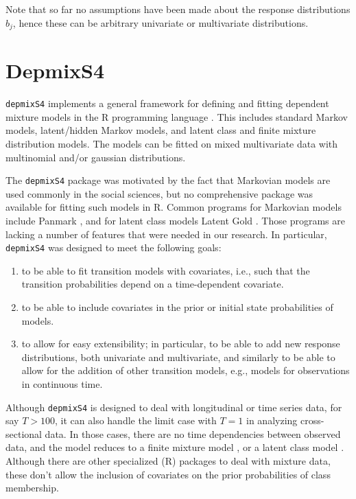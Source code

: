 \documentclass[a4paper,12pt,man]{apa} %
\newcommand{\citep}{\cite}
\newcommand{\pkg}{\texttt}
\begin{document}
Note that so far no assumptions have been made about the response
distributions $b_{j}$, hence these can be arbitrary univariate or
multivariate distributions.


\section{DepmixS4}

\pkg{depmixS4} implements a general framework for defining and fitting
dependent mixture models in the R programming language \citep{R2008}.
This includes standard Markov models, latent/hidden Markov models, and
latent class and finite mixture distribution models.  The models can
be fitted on mixed multivariate data with multinomial and/or gaussian
distributions.  

The \pkg{depmixS4} package was motivated by the fact that Markovian
models are used commonly in the social sciences, but no comprehensive
package was available for fitting such models in R. Common programs
for Markovian models include Panmark \citep{Pol1996}, and for latent
class models Latent Gold \citep{Vermunt2003}.  Those programs are
lacking a number of features that were needed in our research.  In
particular, \pkg{depmixS4} was designed to meet the following goals:
\begin{enumerate}

	\item to be able to fit transition models with covariates, i.e.,
	such that the transition probabilities depend on a time-dependent 
	covariate.

	\item to be able to include covariates in the prior or initial
	state probabilities of models.

	\item to allow for easy extensibility; in particular, to be able
	to add new response distributions, both univariate and
	multivariate, and similarly to be able to allow for the addition
	of other transition models, e.g., models for observations in 
	continuous time. 

\end{enumerate}

Although \pkg{depmixS4} is designed to deal with longitudinal or time
series data, for say $T>100$, it can also handle the limit case with
$T=1$ in analyzing cross-sectional data.  In those cases, there are no
time dependencies between observed data, and the model reduces to a
finite mixture model \cite{McLachlan2000}, or a latent class model
\cite{McCutcheon1987}.  Although there are other specialized (R)
packages to deal with mixture data, these don't allow the inclusion of 
covariates on the prior probabilities of class membership.
\end{document}
